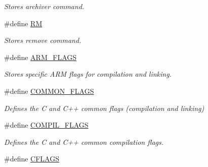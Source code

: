\begin{DoxyCompactItemize}
\begin{DoxyCompactList}\small\item\em Stores archiver command. \end{DoxyCompactList}\item 
\hypertarget{group___automatic___variables_ga4608958cdf4c8b8ff0a6e301c4c23ae1}{\#define \hyperlink{group___automatic___variables_ga4608958cdf4c8b8ff0a6e301c4c23ae1}{R\+M}}\label{group___automatic___variables_ga4608958cdf4c8b8ff0a6e301c4c23ae1}

\begin{DoxyCompactList}\small\item\em Stores remove command. \end{DoxyCompactList}\item 
\hypertarget{group___automatic___variables_ga247a4a06dc5d02e8acde675caba677ce}{\#define \hyperlink{group___automatic___variables_ga247a4a06dc5d02e8acde675caba677ce}{A\+R\+M\+\_\+\+F\+L\+A\+G\+S}}\label{group___automatic___variables_ga247a4a06dc5d02e8acde675caba677ce}

\begin{DoxyCompactList}\small\item\em Stores specific A\+R\+M flags for compilation and linking. \end{DoxyCompactList}\item 
\hypertarget{group___automatic___variables_gab5862f1ced0d65238672a6829da70788}{\#define \hyperlink{group___automatic___variables_gab5862f1ced0d65238672a6829da70788}{C\+O\+M\+M\+O\+N\+\_\+\+F\+L\+A\+G\+S}}\label{group___automatic___variables_gab5862f1ced0d65238672a6829da70788}

\begin{DoxyCompactList}\small\item\em Defines the C and C++ common flags (compilation and linking) \end{DoxyCompactList}\item 
\hypertarget{group___automatic___variables_ga14f1a6b464d32bb9b01a1357ef6c1dec}{\#define \hyperlink{group___automatic___variables_ga14f1a6b464d32bb9b01a1357ef6c1dec}{C\+O\+M\+P\+I\+L\+\_\+\+F\+L\+A\+G\+S}}\label{group___automatic___variables_ga14f1a6b464d32bb9b01a1357ef6c1dec}

\begin{DoxyCompactList}\small\item\em Defines the C and C++ common compilation flags. \end{DoxyCompactList}\item 
\hypertarget{group___automatic___variables_gad96068ccba4fb10c1ecd2faac6ca9935}{\#define \hyperlink{group___automatic___variables_gad96068ccba4fb10c1ecd2faac6ca9935}{C\+F\+L\+A\+G\+S}}\label{group___automatic___variables_gad96068ccba4fb10c1ecd2faac6ca9935}


\end{DoxyCompactItemize}
